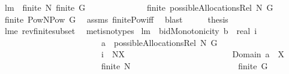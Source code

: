 \begin{isabellebody}
\endisatagproof
{\isafoldproof}%
%
\isadelimproof
\isanewline
%
\endisadelimproof
\isanewline
{}\isamarkupfalse%
\ lm{}{}{\isacharcolon}\ \ {\isachardoublequoteopen}finite\ N{\isachardoublequoteclose}\ {\isachardoublequoteopen}finite\ G{\isachardoublequoteclose}\ \isanewline
\ \ \ \ \ \ \ \ \ \ \ \ \ {\isachardoublequoteopen}finite\ {\isacharparenleft}possibleAllocationsRel\ N\ G{\isacharparenright}{\isachardoublequoteclose}\isanewline
%
\isadelimproof
%
\endisadelimproof
%
\isatagproof
{}\isamarkupfalse%
\ {\isacharminus}\isanewline
\ \ \isamarkupfalse%
\ {\isachardoublequoteopen}finite\ {\isacharparenleft}Pow{\isacharparenleft}N{\isasymtimes}{\isacharparenleft}Pow\ G{\isacharminus}{\isacharbraceleft}{\isacharbraceleft}{\isacharbraceright}{\isacharbraceright}{\isacharparenright}{\isacharparenright}{\isacharparenright}{\isachardoublequoteclose}\ \isamarkupfalse%
\ assms\ finite{\isacharunderscore}Pow{\isacharunderscore}iff\ \isamarkupfalse%
\ blast\isanewline
\ \ \isamarkupfalse%
\ \isamarkupfalse%
\ {\isacharquery}thesis\ \isamarkupfalse%
\ lm{}{}e\ rev{\isacharunderscore}finite{\isacharunderscore}subset\ \isamarkupfalse%
\ {\isacharparenleft}metis{\isacharparenleft}no{\isacharunderscore}types{\isacharparenright}{\isacharparenright}\isanewline
{}\isamarkupfalse%
%
\endisatagproof
{\isafoldproof}%
%
\isadelimproof
\isanewline
%
\endisadelimproof
\isanewline
{}\isamarkupfalse%
\ lm{}{}{\isacharcolon}\ \ {\isachardoublequoteopen}bidMonotonicity\ {\isacharparenleft}b{\isacharcolon}{\isacharcolon}{\isacharunderscore}\ {\isacharequal}{\isachargreater}\ real{\isacharparenright}\ i{\isachardoublequoteclose}\ \isanewline
\ \ \ \ \ \ \ \ \ \ \ \ \ \ \ \ \ \ \ \ \ \ \ \ {\isachardoublequoteopen}a\ {\isasymin}\ possibleAllocationsRel\ N\ G{\isachardoublequoteclose}\ \isanewline
\ \ \ \ \ \ \ \ \ \ \ \ \ \ \ \ \ \ \ \ \ \ \ \ {\isachardoublequoteopen}i\ {\isasymin}\ N{\isacharminus}X{\isachardoublequoteclose}\ \isanewline
\ \ \ \ \ \ \ \ \ \ \ \ \ \ \ \ \ \ \ \ \ \ \ \ {\isachardoublequoteopen}Domain\ a\ {\isasyminter}\ X\ {\isasymnoteq}\ {\isacharbraceleft}{\isacharbraceright}{\isachardoublequoteclose}\ \isanewline
\ \ \ \ \ \ \ \ \ \ \ \ \ \ \ \ \ \ \ \ \ \ \ \ {\isachardoublequoteopen}finite\ N{\isachardoublequoteclose}\ \isanewline
\ \ \ \ \ \ \ \ \ \ \ \ \ \ \ \ \ \ \ \ \ \ \ \ {\isachardoublequoteopen}finite\ G{\isachardoublequoteclose}\ \isanewline

\end{isabellebody}
